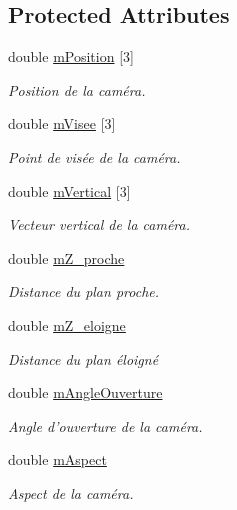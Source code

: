 \subsection*{Protected Attributes}
\begin{DoxyCompactItemize}
\item 
double \hyperlink{class_abstract_camera_aacd5e7f2d881e719f254a1d6e2904b91}{m\+Position} \mbox{[}3\mbox{]}
\begin{DoxyCompactList}\small\item\em Position de la caméra. \end{DoxyCompactList}\item 
double \hyperlink{class_abstract_camera_a5c7db642de2add50fad69539a8b220d8}{m\+Visee} \mbox{[}3\mbox{]}
\begin{DoxyCompactList}\small\item\em Point de visée de la caméra. \end{DoxyCompactList}\item 
double \hyperlink{class_abstract_camera_a64675d12169d6383a9371d7fd710a441}{m\+Vertical} \mbox{[}3\mbox{]}
\begin{DoxyCompactList}\small\item\em Vecteur vertical de la caméra. \end{DoxyCompactList}\item 
double \hyperlink{class_abstract_camera_a408e219c2aed42b6aa4f9198c252d10a}{m\+Z\+\_\+proche}
\begin{DoxyCompactList}\small\item\em Distance du plan proche. \end{DoxyCompactList}\item 
double \hyperlink{class_abstract_camera_a8e076553a55c8e2f19948bdf4ea01be1}{m\+Z\+\_\+eloigne}
\begin{DoxyCompactList}\small\item\em Distance du plan éloigné \end{DoxyCompactList}\item 
double \hyperlink{class_abstract_camera_a5facdc9b6a67be951f8adea9d7ed8756}{m\+Angle\+Ouverture}
\begin{DoxyCompactList}\small\item\em Angle d'ouverture de la caméra. \end{DoxyCompactList}\item 
double \hyperlink{class_abstract_camera_a84ea352c679449eeef49d92274bfc9e0}{m\+Aspect}
\begin{DoxyCompactList}\small\item\em Aspect de la caméra. \end{DoxyCompactList}\end{DoxyCompactItemize}


